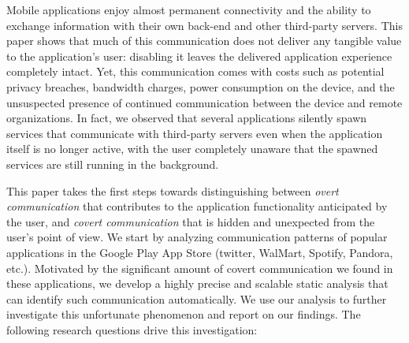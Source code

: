 Mobile applications enjoy almost permanent connectivity and the
ability to exchange information with their own back-end and other
third-party servers.  This paper shows that much of this communication
does not deliver any tangible value to the application's user: 
disabling it leaves the delivered application experience completely
intact.  Yet, this communication comes with costs such as 
potential privacy breaches,
bandwidth charges, power consumption on the device,  
and the unsuspected presence of continued
communication between the device and remote organizations. In fact, we
observed that several applications silently spawn services that
communicate with third-party servers even when the application itself
is no longer active, with the user completely unaware that the spawned
services are still running in the background. 


This paper takes the first steps towards distinguishing between 
\emph{overt communication} that contributes to the application functionality anticipated by the user, and
\emph{covert communication} that is hidden and unexpected from the user's point of view.
We start by
analyzing communication patterns of
popular applications in the Google Play App Store (twitter, WalMart,
Spotify, Pandora, etc.). Motivated by the significant
amount of covert communication we found in these applications, 
we develop a highly precise and scalable static analysis that can identify 
such communication automatically. We use our analysis to further 
investigate this unfortunate phenomenon and report on our findings. 
The following research questions drive this investigation:

